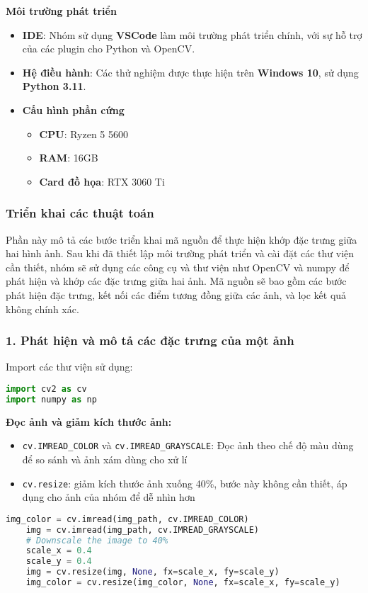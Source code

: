 \textbf{Môi trường phát triển}
\begin{itemize}
	\item \textbf{IDE}: Nhóm sử dụng \textbf{VSCode} làm môi trường phát triển chính, với sự hỗ trợ của các plugin cho Python và OpenCV.
	\item \textbf{Hệ điều hành}: Các thử nghiệm được thực hiện trên \textbf{Windows 10}, sử dụng \textbf{Python 3.11}.
	\item \textbf{Cấu hình phần cứng}
	\begin{itemize}
		\item \textbf{CPU}: Ryzen 5 5600
		\item \textbf{RAM}: 16GB
		\item \textbf{Card đồ họa}: RTX 3060 Ti
	\end{itemize}
\end{itemize}

\subsubsection{Triển khai các thuật toán}
Phần này mô tả các bước triển khai mã nguồn để thực hiện khớp đặc trưng giữa hai hình ảnh. Sau khi đã thiết lập môi trường phát triển và cài đặt các thư viện cần thiết, nhóm sẽ sử dụng các công cụ và thư viện như OpenCV và numpy để phát hiện và khớp các đặc trưng giữa hai ảnh. Mã nguồn sẽ bao gồm các bước phát hiện đặc trưng, kết nối các điểm tương đồng giữa các ảnh, và lọc kết quả không chính xác.
\subsubsection*{1. Phát hiện và mô tả các đặc trưng của một ảnh}
Import các thư viện sử dụng:
\begin{lstlisting}[language=Python]
import cv2 as cv
import numpy as np
\end{lstlisting}

\textbf{Đọc ảnh và giảm kích thước ảnh:}
\begin{itemize}
	\item \texttt{cv.IMREAD\_COLOR} và \texttt{cv.IMREAD\_GRAYSCALE}: Đọc ảnh theo chế độ màu dùng để so sánh và ảnh xám dùng cho xử lí
	\item \texttt{cv.resize}: giảm kích thước ảnh xuống 40\%, bước này không cần thiết, áp dụng cho ảnh của nhóm để dễ nhìn hơn
\end{itemize}

\begin{lstlisting}[language=Python]
	img_color = cv.imread(img_path, cv.IMREAD_COLOR)
	img = cv.imread(img_path, cv.IMREAD_GRAYSCALE)
	# Downscale the image to 40%
	scale_x = 0.4
	scale_y = 0.4
	img = cv.resize(img, None, fx=scale_x, fy=scale_y)
	img_color = cv.resize(img_color, None, fx=scale_x, fy=scale_y)
\end{lstlisting}


